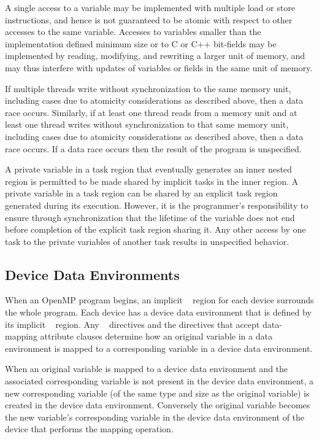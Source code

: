 A single access to a variable may be implemented with multiple load or store
instructions, and hence is not guaranteed to be atomic with respect to other accesses to
the same variable. Accesses to variables smaller than the implementation defined
minimum size or to C or C++ bit-fields may be implemented by reading, modifying, and
rewriting a larger unit of memory, and may thus interfere with updates of variables or
fields in the same unit of memory.

If multiple threads write without synchronization to the same memory unit, including
cases due to atomicity considerations as described above, then a data race occurs.
Similarly, if at least one thread reads from a memory unit and at least one thread writes
without synchronization to that same memory unit, including cases due to atomicity
considerations as described above, then a data race occurs. If a data race occurs then the
result of the program is unspecified.

A private variable in a task region that eventually generates an inner nested 
region is permitted to be made shared by implicit tasks in the inner  region.
A private variable in a task region can be shared by an explicit task region generated
during its execution. However, it is the programmer's responsibility to ensure through
synchronization that the lifetime of the variable does not end before completion of the
explicit task region sharing it. Any other access by one task to the
private variables of another task results in unspecified behavior.




\subsection{Device Data Environments}
\label{subsec:Device Data Environments}
When an OpenMP program begins, an implicit ~ region for each device surrounds the whole program. Each device has a device data environment that is defined by its implicit ~ region. Any ~ directives and the directives that accept data-mapping attribute clauses determine how an original variable in a data environment is mapped to a corresponding variable in a device data environment.

When an original variable is mapped to a device data environment and the associated corresponding variable is not present in the device data environment, a new corresponding variable (of the same type and size as the original variable) is created in the device data environment. Conversely the original variable becomes the new variable's
corresponding variable in the device data environment of the device that performs the mapping operation.


